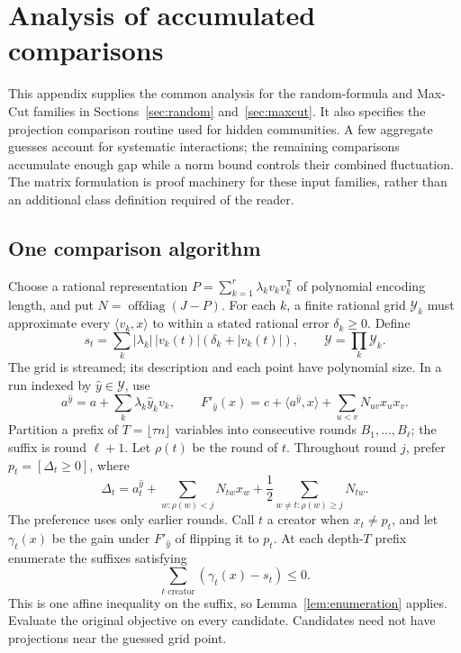\documentclass[11pt,a4paper]{article}
\theoremstyle{definition}
\theoremstyle{remark}
\begin{document}
\section{Analysis of accumulated comparisons}\label{sec:counts}\label{app:accumulation}

This appendix supplies the common analysis for the random-formula and
Max-Cut families in Sections~\ref{sec:random} and~\ref{sec:maxcut}.
It also specifies the projection comparison routine used for hidden
communities. A few aggregate guesses account for systematic interactions;
the remaining comparisons accumulate enough gap while a norm bound
controls their combined fluctuation. The matrix formulation is proof
machinery for these input families, rather than an additional class
definition required of the reader.

\subsection{One comparison algorithm}

Choose a rational representation
$P=\sum_{k=1}^r\lambda_kv_kv_k^{\mathsf T}$ of polynomial encoding length,
and put $N=\operatorname{offdiag}(J-P)$. For each $k$, a finite rational
grid $\mathcal Y_k$ must approximate every $\langle v_k,x\rangle$ to
within a stated rational error $\delta_k\ge0$. Define
\[
 s_t=\sum_k|\lambda_k|\,|v_k(t)|(\delta_k+|v_k(t)|),
 \qquad \mathcal Y=\prod_k\mathcal Y_k.
\]
The grid is streamed; its description and each point have polynomial size.
In a run indexed by $\hat y\in\mathcal Y$, use
\[
 a^{\hat y}=a+\sum_k\lambda_k\hat y_kv_k,
 \qquad F'_{\hat y}(x)=c+\langle a^{\hat y},x\rangle+
                    \sum_{u<v}N_{uv}x_ux_v.
\]
Partition a prefix of $T=\lfloor\tau n\rfloor$ variables into consecutive
rounds $B_1,\ldots,B_\ell$; the suffix is round $\ell+1$.
Let $\rho(t)$ be the round of $t$. Throughout round $j$, prefer
$p_t=[\Delta_t\ge0]$, where
\[
 \Delta_t=a^{\hat y}_t+\sum_{w:\rho(w)<j}N_{tw}x_w
             +\frac12\sum_{w\ne t:\rho(w)\ge j}N_{tw}.
\]
The preference uses only earlier rounds. Call $t$ a creator when
$x_t\ne p_t$, and let $\gamma_t(x)$ be the gain under $F'_{\hat y}$ of
flipping it to $p_t$. At each depth-$T$ prefix enumerate the suffixes satisfying
\begin{equation}
 \sum_{t\text{ creator}}(\gamma_t(x)-s_t)\le0. \label{eq:counts-sum}
\end{equation}
This is one affine inequality on the suffix, so Lemma~\ref{lem:enumeration}
applies. Evaluate the original objective on every candidate. Candidates
need not have projections near the guessed grid point.
\end{document}
